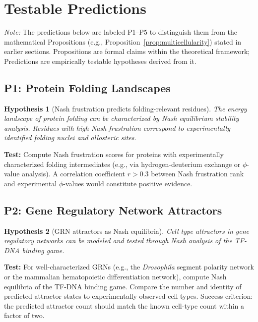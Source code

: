 \documentclass[12pt,a4paper]{article}
\newtheorem{hypothesis}{Hypothesis}
\theoremstyle{remark}
\begin{document}
\section{Testable Predictions}
\label{sec:predictions}

\noindent\textit{Note:} The predictions below are labeled P1--P5 to distinguish them from the mathematical Propositions (e.g., Proposition~\ref{prop:multicellularity}) stated in earlier sections. Propositions are formal claims within the theoretical framework; Predictions are empirically testable hypotheses derived from it.

\subsection{P1: Protein Folding Landscapes}

\begin{hypothesis}[Nash frustration predicts folding-relevant residues]
The energy landscape of protein folding can be characterized by Nash equilibrium stability analysis. Residues with high Nash frustration correspond to experimentally identified folding nuclei and allosteric sites.
\end{hypothesis}

\textbf{Test:} Compute Nash frustration scores for proteins with experimentally characterized folding intermediates (e.g., via hydrogen-deuterium exchange or $\phi$-value analysis). A correlation coefficient $r > 0.3$ between Nash frustration rank and experimental $\phi$-values would constitute positive evidence.

\subsection{P2: Gene Regulatory Network Attractors}

\begin{hypothesis}[GRN attractors as Nash equilibria]
Cell type attractors in gene regulatory networks can be modeled and tested through Nash analysis of the TF-DNA binding game.
\end{hypothesis}

\textbf{Test:} For well-characterized GRNs (e.g., the \textit{Drosophila} segment polarity network or the mammalian hematopoietic differentiation network), compute Nash equilibria of the TF-DNA binding game. Compare the number and identity of predicted attractor states to experimentally observed cell types. Success criterion: the predicted attractor count should match the known cell-type count within a factor of two.
\end{document}
